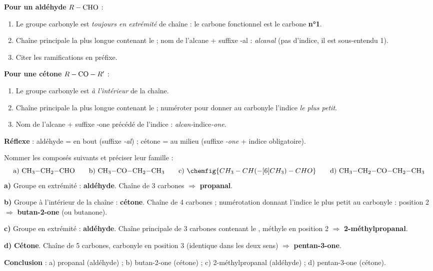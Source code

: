 \documentclass[11pt]{article}
\newcommand{\cle}[1]{{\popxbold\color{popdark}#1}}
\begin{document}
\begin{methode}
\textbf{Pour un aldéhyde} $R-\ce{CHO}$ :
\begin{enumerate}
\item Le groupe carbonyle  est \emph{toujours en extrémité} de chaîne : le carbone fonctionnel est le carbone \textbf{n°1}.
\item Chaîne principale la plus longue contenant le  ; nom de l'alcane + suffixe \cle{-al} : \emph{alcanal} (pas d'indice, il est sous-entendu 1).
\item Citer les ramifications en préfixe.
\end{enumerate}
\textbf{Pour une cétone} $R-\ce{CO}-R'$ :
\begin{enumerate}
\item Le groupe carbonyle est \emph{à l'intérieur} de la chaîne.
\item Chaîne principale la plus longue contenant le  ; numéroter pour donner au carbonyle l'indice \emph{le plus petit}.
\item Nom de l'alcane + suffixe \cle{-one} précédé de l'indice : \emph{alcan-}indice\emph{-one}.
\end{enumerate}
\textbf{Réflexe} : aldéhyde =  en bout (suffixe \emph{-al}) ; cétone =  au milieu (suffixe \emph{-one} + indice obligatoire).
\end{methode}

\begin{exoresolu}
Nommer les composés suivants et préciser leur famille :
\[
\text{a) } \ce{CH3-CH2-CHO} \qquad
\text{b) } \ce{CH3-CO-CH2-CH3} \qquad
\text{c) } \chemfig{CH_3-CH(-[6]CH_3)-CHO} \qquad
\text{d) } \ce{CH3-CH2-CO-CH2-CH3}
\]
\tcblower
\textbf{a)} Groupe  en extrémité : \textbf{aldéhyde}. Chaîne de 3 carbones $\Rightarrow$ \textbf{propanal}.

\textbf{b)} Groupe  à l'intérieur de la chaîne : \textbf{cétone}. Chaîne de 4 carbones ; numérotation donnant l'indice le plus petit au carbonyle : position 2 $\Rightarrow$ \textbf{butan-2-one} (ou butanone).

\textbf{c)} Groupe  en extrémité : \textbf{aldéhyde}. Chaîne principale de 3 carbones contenant le , méthyle en position 2 $\Rightarrow$ \textbf{2-méthylpropanal}.

\textbf{d)} \textbf{Cétone}. Chaîne de 5 carbones, carbonyle en position 3 (identique dans les deux sens) $\Rightarrow$ \textbf{pentan-3-one}.

\textbf{Conclusion} : a) propanal (aldéhyde) ; b) butan-2-one (cétone) ; c) 2-méthylpropanal (aldéhyde) ; d) pentan-3-one (cétone).
\end{exoresolu}
\end{document}
